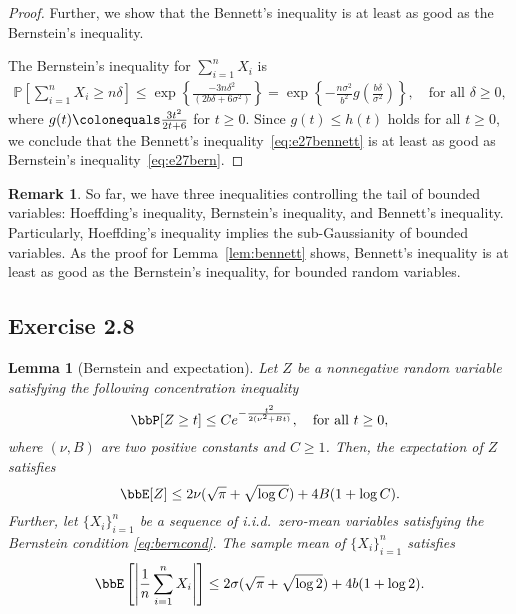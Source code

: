 \documentclass[11pt]{article}
\newcommand{\off}[1]{\left[#1\right]}
\newcommand{\aabs}[1]{\left|#1\right|}
\theoremstyle{plain}
\newtheorem{lem}{Lemma}
\theoremstyle{definition}
\newtheorem{rmk}{Remark}
\begin{document}
\begin{proof}
	\vspace{0.2cm}
	Further, we show that the Bennett's inequality is at least as good as the Bernstein’s inequality.
	
	\vspace{0.2cm}
	The Bernstein's inequality for $\sum_{i=1}^n X_i$ is
	\begin{align}\label{eq:e27bern}
			\mathbb{P}\left[\sum_{i=1}^{n} X_{i} \geq n \delta \right] \leq \exp \left\{ \frac{-3n\delta^2}{(2 b \delta + 6 \sigma^2)} \right\}  %
			= \exp \left\{ -\frac{n \sigma^{2}}{ b^{2}} g\left(\frac{b\delta}{\sigma^2}\right) \right\}, \quad \text{for all } \delta \geq 0,
	\end{align}
	where $g(t) \colonequals  \frac{3t^2}{2t + 6} $ for $ t \geq 0$. Since $g(t)\leq h(t)$ holds for all $t \geq 0$, we conclude that the Bennett's inequality~\eqref{eq:e27bennett} is at least as good as Bernstein's inequality~\eqref{eq:e27bern}. 
\end{proof}

\begin{rmk} 
	So far, we have three inequalities controlling the tail of bounded variables: Hoeffding's inequality, Bernstein's inequality, and Bennett's inequality. Particularly, Hoeffding's inequality implies the sub-Gaussianity of bounded variables. As the proof for Lemma~\ref{lem:bennett} shows, Bennett's inequality is at least as good as the Bernstein's inequality, for bounded random variables.
\end{rmk}

\subsection{Exercise 2.8}
\begin{lem}[Bernstein and expectation] Let $Z$ be a nonnegative random variable satisfying the following concentration inequality
\begin{equation}\label{eq:berncond1}
	\bbP[Z \geq t] \leq C e^{- \frac{t^2}{2(\nu^2 +B t)}}, \quad \text{for all } t \geq 0,
\end{equation}
	where $(\nu, B)$ are two positive constants and $C \geq 1$. Then, the expectation of $Z$ satisfies 
	\begin{equation}\label{eq:bernexpec}
		\bbE[Z] \leq 2 \nu (\sqrt{\pi} + \sqrt{\log C}) + 4B (1 + \log C).
	\end{equation}
	Further, let $\{ X_i\}_{i=1}^n$ be a sequence of i.i.d.\ zero-mean variables satisfying the Bernstein condition \eqref{eq:berncond}. The sample mean of $\{ X_i\}_{i=1}^n$  satisfies
	\begin{equation}\label{eq:e28sample}
		\bbE \off{ \aabs{\frac{1}{n} \sum_{i=1}^n X_i }} \leq 2 \sigma (\sqrt{\pi} + \sqrt{\log 2}) + 4b (1 + \log 2).
	\end{equation}
\end{lem}
\end{document}
